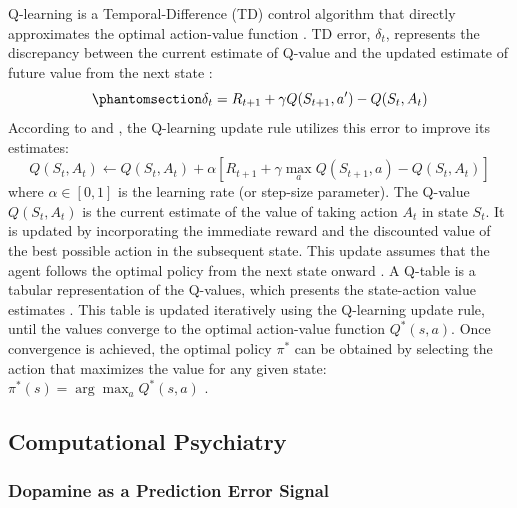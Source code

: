 \documentclass[
  authoryear,
  preprint]{elsarticle}
\begin{document}
Q-learning is a Temporal-Difference (TD) control algorithm that directly
approximates the optimal action-value function \citep{SuttonBarto2020}.
TD error, \(\delta_t\), represents the discrepancy between the current
estimate of Q-value and the updated estimate of future value from the
next state \citep{SuttonBarto2020}:
\begin{equation}\phantomsection\label{eq-td-error}{
\delta_t = R_{t+1} + \gamma Q(S_{t+1}, a') - Q(S_t, A_t)
}\end{equation} According to \citet{SuttonBarto2020} and
\citet{Watkins1992}, the Q-learning update rule utilizes this error to
improve its estimates: \[
Q(S_t, A_t) \leftarrow Q(S_t, A_t) + \alpha \left[ R_{t+1} + \gamma \max_a Q(S_{t+1}, a) - Q(S_t, A_t) \right]
\] where \(\alpha \in [0, 1]\) is the learning rate (or step-size
parameter). The Q-value \(Q(S_t, A_t)\) is the current estimate of the
value of taking action \(A_t\) in state \(S_t\). It is updated by
incorporating the immediate reward and the discounted value of the best
possible action in the subsequent state. This update assumes that the
agent follows the optimal policy from the next state onward
\citep{SuttonBarto2020, Watkins1992}. A Q-table is a tabular
representation of the Q-values, which presents the state-action value
estimates \citep{Jang2019}. This table is updated iteratively using the
Q-learning update rule, until the values converge to the optimal
action-value function \(Q^*(s, a)\). Once convergence is achieved, the
optimal policy \(\pi^*\) can be obtained by selecting the action that
maximizes the value for any given state:
\(\pi^*(s) = \arg\max_{a} Q^*(s, a)\) \citep{SuttonBarto2020}.

\subsection{Computational Psychiatry}\label{computational-psychiatry}

\subsubsection{Dopamine as a Prediction Error Signal}\label{sec-datd}
\end{document}
